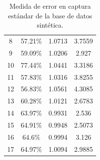 \begin{table}[H]
\begin{tabular}{@{}cccc@{}}
8                           & 57.21\%                                                            & 1.0713                                                             & 3.7559                                                           \\
9                           & 59.09\%                                                            & 1.0206                                                             & 2.927                                                            \\
10                          & 77.44\%                                                            & 1.0441                                                             & 3.3186                                                           \\
11                          & 57.83\%                                                            & 1.0316                                                             & 3.8255                                                           \\
12                          & 56.83\%                                                            & 1.0561                                                             & 4.3085                                                           \\
13                          & 60.28\%                                                            & 1.0121                                                             & 2.6783                                                           \\
14                          & 63.97\%                                                            & 0.9931                                                             & 2.536                                                            \\
15                          & 64.91\%                                                            & 0.9948                                                             & 2.5073                                                           \\
16                          & 64.6\%                                                             & 0.9994                                                             & 3.126                                                            \\
17                          & 64.97\%                                                            & 1.0094                                                             & 2.9885                                                           \\ \bottomrule
\end{tabular}
\caption{Medida de error en captura estándar de la base de datos sintética.}
\label{tablaerrorseg}
\end{table}

